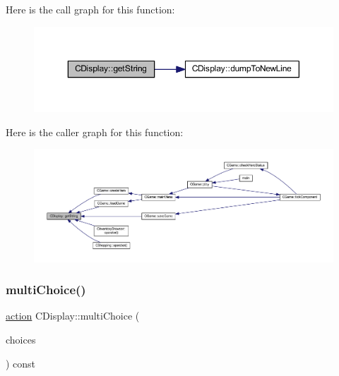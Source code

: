 Here is the call graph for this function\+:\nopagebreak
\begin{figure}[H]
\begin{center}
\leavevmode
\includegraphics[width=350pt]{class_c_display_a1bd3e25973ed15055a68d4db6abfa765_cgraph}
\end{center}
\end{figure}
Here is the caller graph for this function\+:\nopagebreak
\begin{figure}[H]
\begin{center}
\leavevmode
\includegraphics[width=350pt]{class_c_display_a1bd3e25973ed15055a68d4db6abfa765_icgraph}
\end{center}
\end{figure}
\mbox{\label{class_c_display_a7d4efb0285d6cdf757bc34e38718e17d}} 
\subsubsection{\texorpdfstring{multi\+Choice()}{multiChoice()}}
{\footnotesize\ttfamily \mbox{\hyperlink{_actions_list_8h_a2f4ab7bf743142dae2e459aa18f9f1d4}{action}} C\+Display\+::multi\+Choice (\begin{DoxyParamCaption}\item[{const \mbox{\hyperlink{_game_menus_8h_acdb545ed67596d0840e35ed209fecbe9}{multichoice}} \&}]{choices }\end{DoxyParamCaption}) const}

